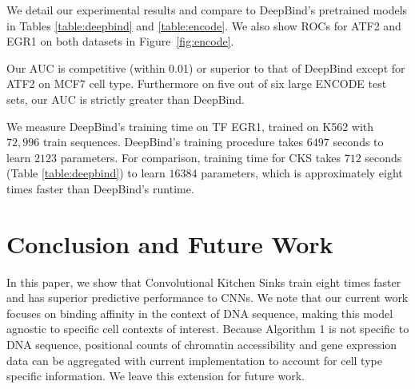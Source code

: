 \documentclass{article}
\begin{document}
We detail our experimental results and compare to DeepBind's pretrained models in Tables \ref{table:deepbind} and \ref{table:encode}.
We also show ROCs for ATF2 and EGR1 on both datasets in Figure~\ref{fig:encode}.

Our AUC is competitive (within 0.01) or superior to that of DeepBind except for ATF2 on MCF7 cell type.
Furthermore on five out of six large ENCODE test sets, our AUC is strictly greater than DeepBind.

We measure DeepBind's training time on TF EGR1, trained on K562 with $72,996$ train sequences.
DeepBind's training procedure takes $6497$ seconds to learn $2123$ parameters.
For comparison, training time for CKS takes $712$ seconds (Table \ref{table:deepbind}) to learn $16384$ parameters, which is approximately eight times faster than DeepBind's runtime.


\section{Conclusion and Future Work}
In this paper, we show that Convolutional Kitchen Sinks train eight times faster and has superior predictive
performance to CNNs.
We note that our current work focuses on binding affinity in the context of DNA sequence,
making this model agnostic to specific cell contexts of interest.
Because Algorithm 1 is not specific to DNA sequence,
positional counts of chromatin
accessibility and gene expression data can be aggregated with current implementation
to account for cell type specific information. We leave this extension for future work.





\end{document}
